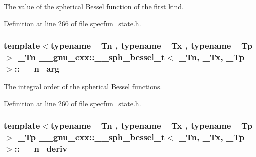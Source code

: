 The value of the spherical Bessel function of the first kind. 



Definition at line 266 of file specfun\+\_\+state.\+h.

\subsubsection[{\texorpdfstring{\+\_\+\+\_\+n\+\_\+arg}{__n_arg}}]{\setlength{\rightskip}{0pt plus 5cm}template$<$typename \+\_\+\+Tn , typename \+\_\+\+Tx , typename \+\_\+\+Tp $>$ \+\_\+\+Tn {\bf \+\_\+\+\_\+gnu\+\_\+cxx\+::\+\_\+\+\_\+sph\+\_\+bessel\+\_\+t}$<$ \+\_\+\+Tn, \+\_\+\+Tx, \+\_\+\+Tp $>$\+::\+\_\+\+\_\+n\+\_\+arg}\hypertarget{struct____gnu__cxx_1_1____sph__bessel__t_a002325ca0f884fb872e1d211e7885d58}{}\label{struct____gnu__cxx_1_1____sph__bessel__t_a002325ca0f884fb872e1d211e7885d58}


The integral order of the spherical Bessel functions. 



Definition at line 260 of file specfun\+\_\+state.\+h.

\subsubsection[{\texorpdfstring{\+\_\+\+\_\+n\+\_\+deriv}{__n_deriv}}]{\setlength{\rightskip}{0pt plus 5cm}template$<$typename \+\_\+\+Tn , typename \+\_\+\+Tx , typename \+\_\+\+Tp $>$ \+\_\+\+Tp {\bf \+\_\+\+\_\+gnu\+\_\+cxx\+::\+\_\+\+\_\+sph\+\_\+bessel\+\_\+t}$<$ \+\_\+\+Tn, \+\_\+\+Tx, \+\_\+\+Tp $>$\+::\+\_\+\+\_\+n\+\_\+deriv}\hypertarget{struct____gnu__cxx_1_1____sph__bessel__t_a84247b0cc2295f300c523d85a3cc601f}{}\label{struct____gnu__cxx_1_1____sph__bessel__t_a84247b0cc2295f300c523d85a3cc601f}


